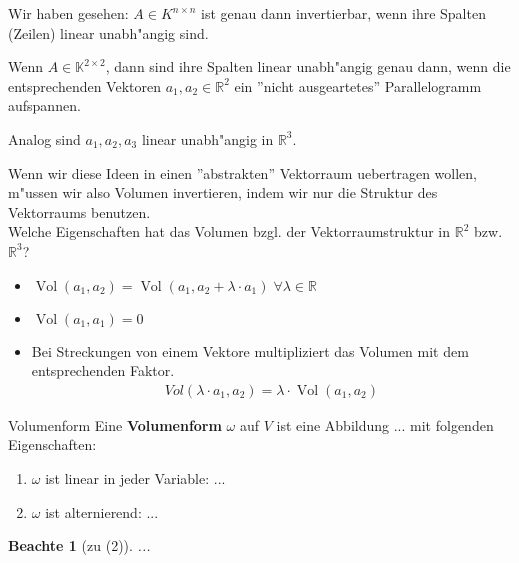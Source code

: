 \documentclass[11pt]{article}
\DeclareMathOperator{\mVol}{Vol}
\newtheorem*{notte}{Beachte}
\begin{document}
\begin{relation}
\begin{trivlist}
  \item Wir haben gesehen: $A\in K^{n\times n}$ ist genau dann invertierbar, wenn ihre Spalten
  (Zeilen) linear unabh"angig sind.
 
  \item  Wenn $A\in \mathbb{K}^{2\times 2}$, dann sind ihre
  Spalten linear unabh"angig genau dann, wenn die entsprechenden Vektoren $a_1,
  a_2 \in \mathbb{R}^2$ ein ''nicht ausgeartetes'' Parallelogramm aufspannen. \\

  \item Analog sind $a_1, a_2, a_3$ linear unabh"angig in $\mathbb{R}^3$.
\end{trivlist}
\end{relation}

Wenn wir diese Ideen in einen ''abstrakten'' Vektorraum uebertragen wollen,
m"ussen wir also Volumen invertieren, indem wir nur die Struktur des
Vektorraums benutzen.\\

Welche Eigenschaften hat das Volumen bzgl. der Vektorraumstruktur in
$\mathbb{R}^2$ bzw. $\mathbb{R}^3$?
\begin{itemize}
\item $\mVol(a_1,a_2)=\mVol(a_1, a_2 + \lambda \cdot a_1)\; \forall \lambda \in
  \mathbb{R}$
\item $\mVol(a_1,a_1)=0$
\item Bei Streckungen von einem Vektore multipliziert das Volumen mit dem
  entsprechenden Faktor.
  \begin{align*}
    Vol(\lambda\cdot a_1, a_2)=\lambda\cdot \mVol(a_1,a_2) \tag{$\lambda \geq 0$}
    \end{align*}
\end{itemize}

\begin{definition}{Volumenform}
  Eine \textbf{Volumenform} $\omega$ auf $V$ ist eine Abbildung ... mit
  folgenden Eigenschaften:
  \begin{enumerate}
  \item $\omega$ ist linear in jeder Variable: ...
  \item $\omega$ ist alternierend: ...
  \end{enumerate}
\end{definition}

\begin{notte}[zu (2)]
  ...
\end{notte}
\end{document}
